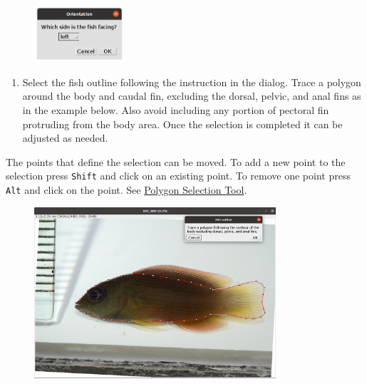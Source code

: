 \documentclass[
  letterpaper,
  DIV=11,
  numbers=noendperiod,
  oneside]{scrreprt}
\providecommand{\tightlist}{%
  \setlength{\itemsep}{0pt}\setlength{\parskip}{0pt}}\usepackage{longtable,booktabs,array}
\begin{document}
\begin{figure}

{\centering \includegraphics[width=0.3\textwidth,height=\textheight]{./images/screenshots/orientation.png}

}

\end{figure}

\begin{enumerate}
\def\labelenumi{\arabic{enumi}.}
\setcounter{enumi}{3}
\tightlist
\item
  Select the fish outline following the instruction in the dialog. Trace
  a polygon around the body and caudal fin, excluding the dorsal,
  pelvic, and anal fins as in the example below. Also avoid including
  any portion of pectoral fin protruding from the body area. Once the
  selection is completed it can be adjusted as needed.
\end{enumerate}

\begin{tcolorbox}[standard jigsaw,arc=.35mm, toptitle=1mm, titlerule=0mm, bottomtitle=1mm, left=2mm, colbacktitle=quarto-callout-tip-color!10!white, colback=white, opacityback=0, leftrule=.75mm, title=\textcolor{quarto-callout-tip-color}{\faLightbulb}\hspace{0.5em}{Tip}, coltitle=black, rightrule=.15mm, bottomrule=.15mm, toprule=.15mm, opacitybacktitle=0.6, colframe=quarto-callout-tip-color-frame]
The points that define the selection can be moved. To add a new point to
the selection press \texttt{Shift} and click on an existing point. To
remove one point press \texttt{Alt} and click on the point. See
\href{https://imagej.nih.gov/ij/docs/guide/146-19.html}{Polygon
Selection Tool}.
\end{tcolorbox}

\begin{figure}

{\centering \includegraphics[width=0.8\textwidth,height=\textheight]{./images/screenshots/fish_outline.png}

}

\end{figure}
\end{document}
